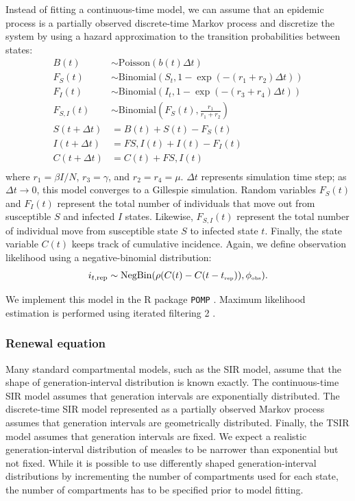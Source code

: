 \documentclass{article}
\newcommand{\tsub}[2]{#1_{{\textrm{\tiny #2}}}}
\begin{document}
Instead of fitting a continuous-time model, we can assume that an epidemic process is a partially observed discrete-time Markov process and discretize the system by using a hazard approximation to the transition probabilities between states:
\begin{equation}
\begin{aligned}
B(t) &\sim \mathrm{Poisson}(b(t) \Delta t)\\
F_{S}(t) &\sim \mathrm{Binomial}(S_t, 1 - \exp(- (r_1 + r_2) \Delta t))\\
F_{I}(t) &\sim \mathrm{Binomial}(I_t, 1 - \exp(- (r_3 + r_4) \Delta t))\\
F_{S,I}(t) &\sim \mathrm{Binomial}\left(F_{S}(t), \frac{r_1}{r_1 + r_2}\right)\\
S(t+\Delta t) &= B(t) + S(t) - F_{S}(t) \\
I(t+\Delta t) &= F{S,I}(t) + I(t) - F_{I}(t)\\
C(t+\Delta t) &= C(t) + F{S,I}(t)\\
\end{aligned}
\end{equation}
where $r_1 = \beta I/N$, $r_3 = \gamma$, and $r_2 = r_4 = \mu$.
$\Delta t$ represents simulation time step; as $\Delta t \to 0$, this model converges to a Gillespie simulation.
Random variables $F_S(t)$ and $F_I(t)$ represent the total number of individuals that move out from susceptible $S$ and infected $I$ states. 
Likewise, $F_{S, I}(t)$ represent the total number of individual move from susceptible state $S$ to infected state $t$.
Finally, the state variable $C(t)$ keeps track of cumulative incidence.
Again, we define observation likelihood using a negative-binomial distribution:
\begin{equation}
i_{t, {\tiny \textrm{rep}}} \sim \mathrm{NegBin}(\rho (C(t) - C(t - \tsub{t}{rep})) , \tsub{\phi}{obs}).
\end{equation}

We implement this model in the R package \texttt{POMP} \citep{king2015statistical}.
Maximum likelihood estimation is performed using iterated filtering 2 \citep{ionides2015inference}.

\subsubsection*{Renewal equation}

Many standard compartmental models, such as the SIR model, assume that the shape of generation-interval distribution is known exactly.
The continuous-time SIR model assumes that generation intervals are exponentially distributed.
The discrete-time SIR model represented as a partially observed Markov process assumes that generation intervals are geometrically distributed.
Finally, the TSIR model assumes that generation intervals are fixed.
We expect a realistic generation-interval distribution of measles to be narrower than exponential but not fixed.
While it is possible to use differently shaped generation-interval distributions by incrementing the number of compartments used for each state, the number of compartments has to be specified prior to model fitting.
\end{document}
